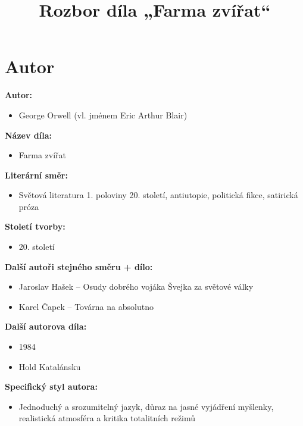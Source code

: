 \documentclass[12pt,a4paper]{article}
\title{\textbf{Rozbor díla „Farma zvířat“}}
\author{}
\date{}
\begin{document}
\maketitle

\section*{Autor}

\begin{tcolorbox}[breakable]

\textbf{Autor:}
\begin{itemize}
\item George Orwell (vl. jménem Eric Arthur Blair)
\end{itemize}

\textbf{Název díla:}
\begin{itemize}
\item Farma zvířat
\end{itemize}

\textbf{Literární směr:}
\begin{itemize}
\item Světová literatura 1. poloviny 20. století, antiutopie, politická fikce, satirická próza
\end{itemize}

\textbf{Století tvorby:}
\begin{itemize}
\item 20. století
\end{itemize}

\textbf{Další autoři stejného směru + dílo:}
\begin{itemize}
\item Jaroslav Hašek – Osudy dobrého vojáka Švejka za světové války
\item Karel Čapek – Továrna na absolutno
\end{itemize}

\textbf{Další autorova díla:}
\begin{itemize}
\item 1984
\item Hold Katalánsku
\end{itemize}

\textbf{Specifický styl autora:}
\begin{itemize}
\item Jednoduchý a srozumitelný jazyk, důraz na jasné vyjádření myšlenky, realistická atmosféra a kritika totalitních režimů
\end{itemize}

\end{tcolorbox}
\end{document}

